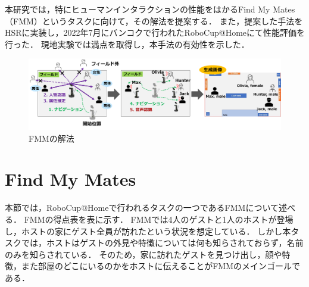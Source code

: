 \documentclass[a4j]{jarticle}
\begin{document}
本研究では，特にヒューマンインタラクションの性能をはかるFind My Mates（FMM）というタスクに向けて，その解法を提案する．
また，提案した手法をHSRに実装し，2022年7月にバンコクで行われたRoboCup@Homeにて性能評価を行った．
現地実験では満点を取得し，本手法の有効性を示した．

\begin{figure}[ht]
  \centering
  \includegraphics[width=16cm]{images/FMM/solution_overview_yoko_yy2.png}
  \caption{FMMの解法}
  \label{solution_overview}
\end{figure}



\section{Find My Mates}
本節では，RoboCup@Homeで行われるタスクの一つであるFMMについて述べる．
FMMの得点表を表\label{points_table_fmm}に示す．
FMMでは4人のゲストと1人のホストが登場し，ホストの家にゲスト全員が訪れたという状況を想定している．
しかし本タスクでは，ホストはゲストの外見や特徴については何も知らされておらず，名前のみを知らされている．
そのため，家に訪れたゲストを見つけ出し，顔や特徴，また部屋のどこにいるのかをホストに伝えることがFMMのメインゴールである．
\end{document}
